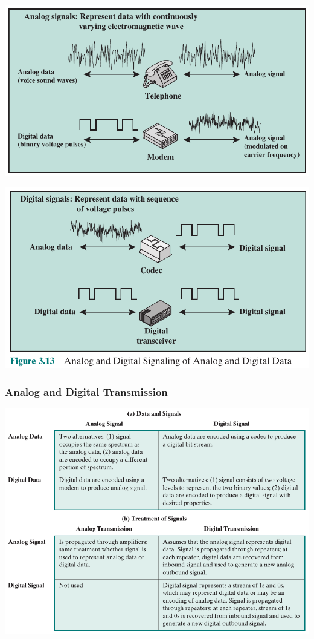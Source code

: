 \documentclass[pdflatex,compress]{beamer}
\begin{document}
\begin{frame}
	\begin{center}
		\includegraphics[width=\linewidth]{img/img12}
	\end{center}
\end{frame}

\begin{frame}
	\begin{center}
		\includegraphics[width=\linewidth]{img/img13}
	\end{center}
\end{frame}

\begin{frame}
	\frametitle{Analog and Digital Transmission}
	\begin{center}
		\includegraphics[width=0.8\linewidth]{img/img14}
	\end{center}
\end{frame}
\end{document}
